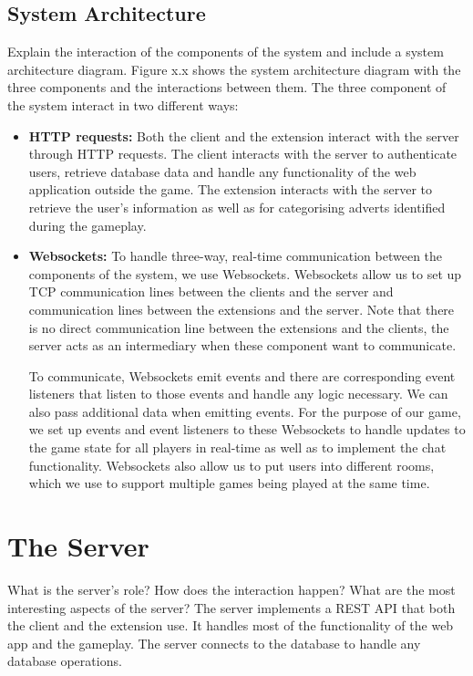 \documentclass{l4proj}
\begin{document}
\subsection{System Architecture}
Explain the interaction of the components of the system and include a system architecture diagram.
Figure x.x shows the system architecture diagram with the three components and the interactions between them. The three component of the system interact in two different ways:
\begin{itemize}
   \item
   \textbf{HTTP requests:} Both the client and the extension interact with the server through HTTP requests. The client interacts with the server to authenticate users, retrieve database data and handle any functionality of the web application outside the game. The extension interacts with the server to retrieve the user's information as well as for categorising adverts identified during the gameplay.
   \item
   \textbf{Websockets:} To handle three-way, real-time communication between the components of the system, we use Websockets. Websockets allow us to set up TCP communication lines between the clients and the server and communication lines between the extensions and the server. Note that there is no direct communication line between the extensions and the clients, the server acts as an intermediary when these component want to communicate. 

To communicate, Websockets emit events and there are corresponding event listeners that listen to those events and handle any logic necessary. We can also pass additional data when emitting events. For the purpose of our game, we set up events and event listeners to these Websockets to handle updates to the game state for all players in real-time as well as to implement the chat functionality. Websockets also allow us to put users into different rooms, which we use to support multiple games being played at the same time.
\end{itemize}

\section{The Server}
What is the server's role? How does the interaction happen? What are the most interesting aspects of the server?
The server implements a REST API that both the client and the extension use. It handles most of the functionality of the web app and the gameplay. The server connects to the database to handle any database operations. 
\end{document}
